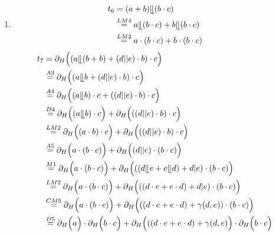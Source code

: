\documentclass[a4paper]{scrartcl}
\begin{document}
\begin{enumerate}
    \item
        \begin{equation}
            \begin{split}
                t_6 &= (a + b) \llfloor (b \cdot c) \\
                &\stackrel{LM4}{=} a \llfloor (b \cdot c) + b \llfloor (b \cdot c) \\
                &\stackrel{LM2}{=} a \cdot (b \cdot c) + b \cdot (b \cdot c)
            \end{split}
        \end{equation}
        \begin{equation}
            \begin{split}
                t_7 &= \partial_H \Big( (a \llfloor (b + b) + (d || e)
                    \cdot b) \cdot c \Big) \\
                &\stackrel{A3}{=} \partial_H \Big( (a \llfloor b + (d || e)
                    \cdot b) \cdot c \Big) \\
                &\stackrel{A4}{=} \partial_H \Big( (a \llfloor b) \cdot c + ((d || e)
                    \cdot b) \cdot c \Big) \\
                &\stackrel{D4}{=} \partial_H \Big( (a \llfloor b) \cdot c \Big)
                    + \partial_H \Big( ((d || e) \cdot b) \cdot c \Big) \\
                &\stackrel{LM2}{=} \partial_H \Big( (a \cdot b) \cdot c \Big)
                    + \partial_H \Big( ((d || e) \cdot b) \cdot c \Big) \\
                &\stackrel{A5}{=} \partial_H \Big( a \cdot (b \cdot c) \Big)
                    + \partial_H \Big( (d || e) \cdot (b \cdot c) \Big) \\
                &\stackrel{M1}{=} \partial_H \Big( a \cdot (b \cdot c) \Big)
                    + \partial_H \Big( ((d \llfloor e + e \llfloor d) + d | e) \cdot (b \cdot c) \Big) \\
                &\stackrel{LM2}{=} \partial_H \Big( a \cdot (b \cdot c) \Big)
                    + \partial_H \Big( ((d \cdot e + e \cdot d) + d | e) \cdot (b \cdot c) \Big) \\
                &\stackrel{CM5}{=} \partial_H \Big( a \cdot (b \cdot c) \Big)
                    + \partial_H \Big( ((d \cdot e + e \cdot d) + \gamma(d,e)) \cdot (b \cdot c) \Big) \\
                &\stackrel{D5}{=} \partial_H \Big( a \Big) \cdot \partial_H \Big( b \cdot c \Big)
                    + \partial_H \Big( ((d \cdot e + e \cdot d) + \gamma(d,e) \Big) \cdot \partial_H \Big( b \cdot c \Big) \\

\end{split}
\end{equation}
\end{enumerate}
\end{document}
